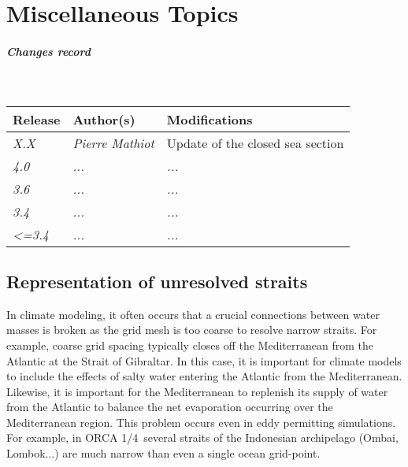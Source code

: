 \documentclass[../main/NEMO_manual]{subfiles}
\begin{document}
\chapter{Miscellaneous Topics}
\label{chap:MISC}

\chaptertoc

\paragraph{Changes record} ~\\

{\footnotesize
  \begin{tabularx}{\textwidth}{l||X|X}
    Release     & Author(s)            & Modifications                      \\
    \hline
    {\em   X.X} & {\em Pierre Mathiot} & {Update of the closed sea section} \\
    {\em   4.0} & {\em ...           } & {\em ...                         } \\
    {\em   3.6} & {\em ...           } & {\em ...                         } \\
    {\em   3.4} & {\em ...           } & {\em ...                         } \\
    {\em <=3.4} & {\em ...           } & {\em ...                         }
  \end{tabularx}
}

\clearpage

\section{Representation of unresolved straits}
\label{sec:MISC_strait}

In climate modeling, it often occurs that a crucial connections between water masses is broken as
the grid mesh is too coarse to resolve narrow straits.
For example, coarse grid spacing typically closes off the Mediterranean from the Atlantic at
the Strait of Gibraltar.
In this case, it is important for climate models to include the effects of salty water entering the Atlantic from
the Mediterranean.
Likewise, it is important for the Mediterranean to replenish its supply of water from the Atlantic to
balance the net evaporation occurring over the Mediterranean region.
This problem occurs even in eddy permitting simulations.
For example, in ORCA 1/4\deg\ several straits of the Indonesian archipelago (Ombai, Lombok...)
are much narrow than even a single ocean grid-point.
\end{document}

